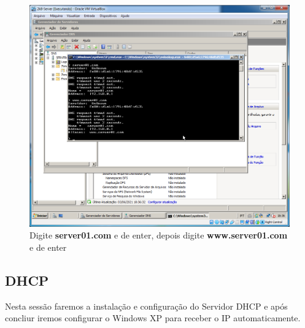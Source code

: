 \documentclass[10pt]{article}
\begin{document}
\begin{figure}[H]
    \centering
    \caption{Digite \textbf{server01.com} e de enter, depois digite \textbf{www.server01.com} e de enter}
    \label{fig:DNS042}
    \includegraphics[width=\linewidth]{images/windows_server/dns/042.png}
\end{figure}

\subsection{DHCP}
\par Nesta sessão faremos a instalação e configuração do Servidor DHCP e após concliur iremos configurar o Windows XP para receber o IP automaticamente.
\end{document}

